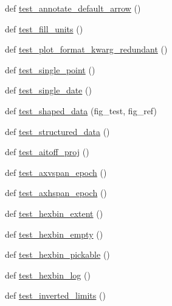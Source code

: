 \begin{DoxyCompactItemize}
def \hyperlink{namespacematplotlib_1_1tests_1_1test__axes_a9f1074606508ec5ebac117987fba03dd}{test\+\_\+annotate\+\_\+default\+\_\+arrow} ()
\item 
def \hyperlink{namespacematplotlib_1_1tests_1_1test__axes_a60b52e86dfb2e43a239c7dcdc92b4c84}{test\+\_\+fill\+\_\+units} ()
\item 
def \hyperlink{namespacematplotlib_1_1tests_1_1test__axes_ae234f5f443c0dd3c9fbe8a4c1d6e6c94}{test\+\_\+plot\+\_\+format\+\_\+kwarg\+\_\+redundant} ()
\item 
def \hyperlink{namespacematplotlib_1_1tests_1_1test__axes_a29dc542050c91a902fb0d7cccc4e87c0}{test\+\_\+single\+\_\+point} ()
\item 
def \hyperlink{namespacematplotlib_1_1tests_1_1test__axes_a7c8dc2b0655f58a97ccc4c4b39f08cdc}{test\+\_\+single\+\_\+date} ()
\item 
def \hyperlink{namespacematplotlib_1_1tests_1_1test__axes_a419a847d5b8fcfc29870e65b79d50547}{test\+\_\+shaped\+\_\+data} (fig\+\_\+test, fig\+\_\+ref)
\item 
def \hyperlink{namespacematplotlib_1_1tests_1_1test__axes_a9445460ef2c69956b8f588e3adc9f199}{test\+\_\+structured\+\_\+data} ()
\item 
def \hyperlink{namespacematplotlib_1_1tests_1_1test__axes_aa9b0d75fdc38fad6ed576c57c5247382}{test\+\_\+aitoff\+\_\+proj} ()
\item 
def \hyperlink{namespacematplotlib_1_1tests_1_1test__axes_adf07cacc14deb7c15304dbf1af3fcae3}{test\+\_\+axvspan\+\_\+epoch} ()
\item 
def \hyperlink{namespacematplotlib_1_1tests_1_1test__axes_af36e4e2a8c51e4ad4f0cb09280bf5303}{test\+\_\+axhspan\+\_\+epoch} ()
\item 
def \hyperlink{namespacematplotlib_1_1tests_1_1test__axes_a32129837992f6ee45e06630a0e7e6c14}{test\+\_\+hexbin\+\_\+extent} ()
\item 
def \hyperlink{namespacematplotlib_1_1tests_1_1test__axes_a625dbf12186615271025c1505695e227}{test\+\_\+hexbin\+\_\+empty} ()
\item 
def \hyperlink{namespacematplotlib_1_1tests_1_1test__axes_a69877590725e5fde0c8c5aba5ead1687}{test\+\_\+hexbin\+\_\+pickable} ()
\item 
def \hyperlink{namespacematplotlib_1_1tests_1_1test__axes_a84de77610b3abea8a0f23abd5cc8a39d}{test\+\_\+hexbin\+\_\+log} ()
\item 
def \hyperlink{namespacematplotlib_1_1tests_1_1test__axes_a1892b731c6573629e416356dbf5ac086}{test\+\_\+inverted\+\_\+limits} ()

\end{DoxyCompactItemize}
